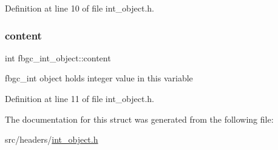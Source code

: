 Definition at line 10 of file int\+\_\+object.\+h.

\mbox{\label{structfbgc__int__object_a79d3de9dbff05bbda39e3a5a7440151e}} 
\subsubsection{\texorpdfstring{content}{content}}
{\footnotesize\ttfamily int fbgc\+\_\+int\+\_\+object\+::content}

fbgc\+\_\+int object holds integer value in this variable 

Definition at line 11 of file int\+\_\+object.\+h.



The documentation for this struct was generated from the following file\+:\begin{DoxyCompactItemize}
\item 
src/headers/\hyperlink{int__object_8h}{int\+\_\+object.\+h}\end{DoxyCompactItemize}
